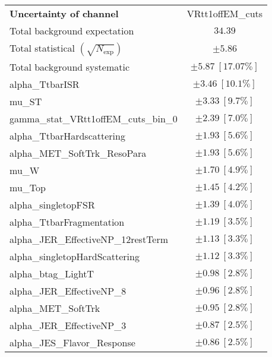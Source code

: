 
\begin{table}
\begin{center}
\setlength{\tabcolsep}{0.0pc}
\begin{tabular*}{\textwidth}{@{\extracolsep{\fill}}lc}
\noalign{\smallskip}\hline\noalign{\smallskip}
{\textbf{Uncertainty of channel}}                                    & VRtt1offEM\_cuts            \\
\noalign{\smallskip}\hline\noalign{\smallskip}
Total background expectation             &  $34.39$       \\
\noalign{\smallskip}\hline\noalign{\smallskip}
Total statistical $(\sqrt{N_{\mathrm{exp}}})$              & $\pm 5.86$       \\
Total background systematic               & $\pm 5.87\ [17.07\%] $             \\
\noalign{\smallskip}\hline\noalign{\smallskip}
\noalign{\smallskip}\hline\noalign{\smallskip}
alpha\_TtbarISR         & $\pm 3.46\ [10.1\%] $       \\
mu\_ST         & $\pm 3.33\ [9.7\%] $       \\
gamma\_stat\_VRtt1offEM\_cuts\_bin\_0         & $\pm 2.39\ [7.0\%] $       \\
alpha\_TtbarHardscattering         & $\pm 1.93\ [5.6\%] $       \\
alpha\_MET\_SoftTrk\_ResoPara         & $\pm 1.93\ [5.6\%] $       \\
mu\_W         & $\pm 1.70\ [4.9\%] $       \\
mu\_Top         & $\pm 1.45\ [4.2\%] $       \\
alpha\_singletopFSR         & $\pm 1.39\ [4.0\%] $       \\
alpha\_TtbarFragmentation         & $\pm 1.19\ [3.5\%] $       \\
alpha\_JER\_EffectiveNP\_12restTerm         & $\pm 1.13\ [3.3\%] $       \\
alpha\_singletopHardScattering         & $\pm 1.12\ [3.3\%] $       \\
alpha\_btag\_LightT         & $\pm 0.98\ [2.8\%] $       \\
alpha\_JER\_EffectiveNP\_8         & $\pm 0.96\ [2.8\%] $       \\
alpha\_MET\_SoftTrk         & $\pm 0.95\ [2.8\%] $       \\
alpha\_JER\_EffectiveNP\_3         & $\pm 0.87\ [2.5\%] $       \\
alpha\_JES\_Flavor\_Response         & $\pm 0.86\ [2.5\%] $       \\

\end{tabular*}
\end{center}
\end{table}
